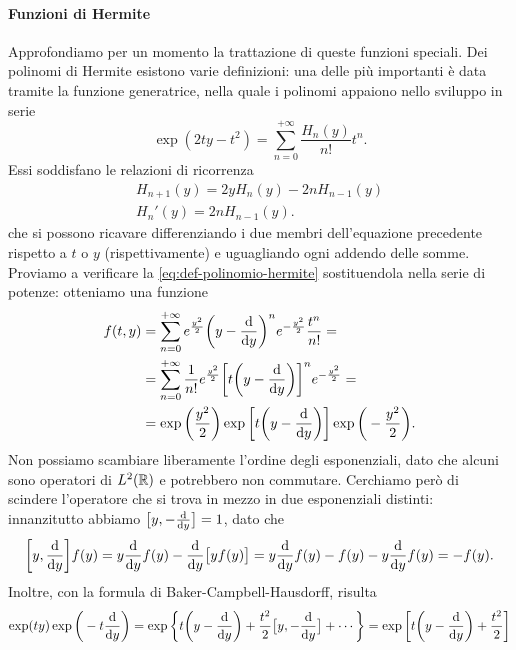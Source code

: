 \paragraph{Funzioni di Hermite}
Approfondiamo per un momento la trattazione di queste funzioni speciali.
Dei polinomi di Hermite esistono varie definizioni: una delle più importanti è data tramite la funzione generatrice, nella quale i polinomi appaiono nello sviluppo in serie
\begin{equation}
	\exp(2ty-t^2)=\sum_{n=0}^{+\infty}\frac{H_n(y)}{n!}t^n.
	\label{eq:funzione-generatrice-polinomi-hermite}
\end{equation}
Essi soddisfano le relazioni di ricorrenza
\begin{equation}
	\begin{gathered}
		H_{n+1}(y)=2yH_n(y)-2nH_{n-1}(y)\\
		H_n'(y)=2nH_{n-1}(y).
	\end{gathered}
	\label{eq:ricorrenza-polinomi-hermite}
\end{equation}
che si possono ricavare differenziando i due membri dell'equazione precedente rispetto a $t$ o $y$ (rispettivamente) e uguagliando ogni addendo delle somme.
Proviamo a verificare la \eqref{eq:def-polinomio-hermite} sostituendola nella serie di potenze: otteniamo una funzione
\begin{equation}
	\begin{split}
		f(t,y)&=\sum_{n=0}^{+\infty}e^{\frac{y^2}2}\bigg(y-\frac{\textup{d} {}}{\textup{d} {y}}\bigg)^ne^{-\frac{y^2}2}\frac{t^n}{n!}=\\
		&=\sum_{n=0}^{+\infty}\frac1{n!}e^{\frac{y^2}2}\bigg[t\bigg(y-\frac{\textup{d} {}}{\textup{d} {y}}\bigg)\bigg]^ne^{-\frac{y^2}2}=\\
		&=\exp\bigg(\frac{y^2}2\bigg)\exp\bigg[t\bigg(y-\frac{\textup{d} {}}{\textup{d} {y}}\bigg)\bigg]\exp\bigg(-\frac{y^2}2\bigg).
	\end{split}
\end{equation}
Non possiamo scambiare liberamente l'ordine degli esponenziali, dato che alcuni sono operatori di $L^2(\mathbb{R})$ e potrebbero non commutare.
Cerchiamo però di scindere l'operatore che si trova in mezzo in due esponenziali distinti: innanzitutto abbiamo $\big[y,-\frac{\textup{d} {}}{\textup{d} {y}}\big]=1$, dato che
\begin{equation}
	\bigg[y,\frac{\textup{d} {}}{\textup{d} {y}}\bigg]f(y)=y\frac{\textup{d} {}}{\textup{d} {y}}f(y)-\frac{\textup{d} {}}{\textup{d} {y}}\big[yf(y)\big]=y\frac{\textup{d} {}}{\textup{d} {y}}f(y)-f(y)-y\frac{\textup{d} {}}{\textup{d} {y}}f(y)=-f(y).
\end{equation}
Inoltre, con la formula di Baker-Campbell-Hausdorff, risulta
\begin{equation}
	\exp(ty)\exp\bigg(-t\frac{\textup{d} {}}{\textup{d} {y}}\bigg)=\exp\bigg\{t\bigg(y-\frac{\textup{d} {}}{\textup{d} {y}}\bigg)+\frac{t^2}2\big[y,-\frac{\textup{d} {}}{\textup{d} {y}}\big]+\cdots\bigg\}=\exp\bigg[t\bigg(y-\frac{\textup{d} {}}{\textup{d} {y}}\bigg)+\frac{t^2}2\bigg]
\end{equation}
